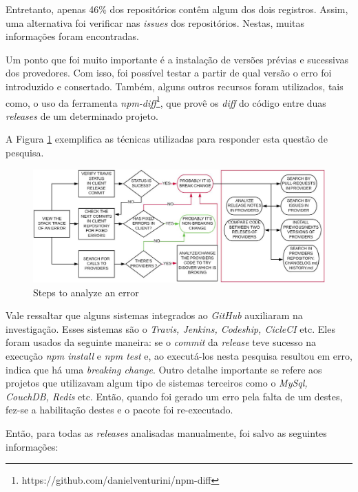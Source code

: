 Entretanto, apenas 46\% dos repositórios contêm algum dos dois registros. Assim, uma alternativa foi verificar nas \textit{issues} dos repositórios. Nestas, muitas informações foram encontradas.

Um ponto que foi muito importante é a instalação de versões prévias e sucessivas dos provedores. Com isso, foi possível testar a partir de qual versão o erro foi introduzido e consertado. Também, alguns outros recursos foram utilizados, tais como, o uso da ferramenta \textit{npm-diff}\footnote{https://github.com/danielventurini/npm-diff}, que provê os \textit{diff} do código entre duas \textit{releases} de um determinado projeto.

A Figura \ref{fig:step_analyze} exemplifica as técnicas utilizadas para responder esta questão de pesquisa.

\begin{figure}
    \centering
    \includegraphics[scale=0.35]{figuras/step_analyze.jpeg}
    \caption{Steps to analyze an error}
    \label{fig:step_analyze}
\end{figure}

Vale ressaltar que alguns sistemas integrados ao \textit{GitHub} auxiliaram na investigação. Esses sistemas são o \textit{Travis, Jenkins, Codeship, CicleCI} etc. Eles foram usados da seguinte maneira: se o \textit{commit} da \textit{release} teve sucesso na execução \textit{npm install} e \textit{npm test} e, ao executá-los nesta pesquisa resultou em erro, indica que há uma \textit{breaking change}. Outro detalhe importante se refere aos projetos que utilizavam algum tipo de sistemas terceiros como o \textit{MySql, CouchDB, Redis} etc. Então, quando foi gerado um erro pela falta de um destes, fez-se a habilitação destes e o pacote foi re-executado.

Então, para todas as \textit{releases} analisadas manualmente, foi salvo as seguintes informações:

